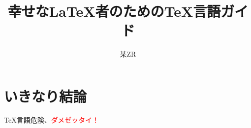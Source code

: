\documentclass[uplatex,dvipdfmx,a4paper]{jsarticle}
\title{幸せな{\LaTeX}者のための{\TeX}言語ガイド}
\author{某ZR}
\begin{document}
\maketitle

\section{いきなり結論}
{\TeX}言語危険、\textcolor{red}{\sffamily ダメゼッタイ！}
\end{document}
